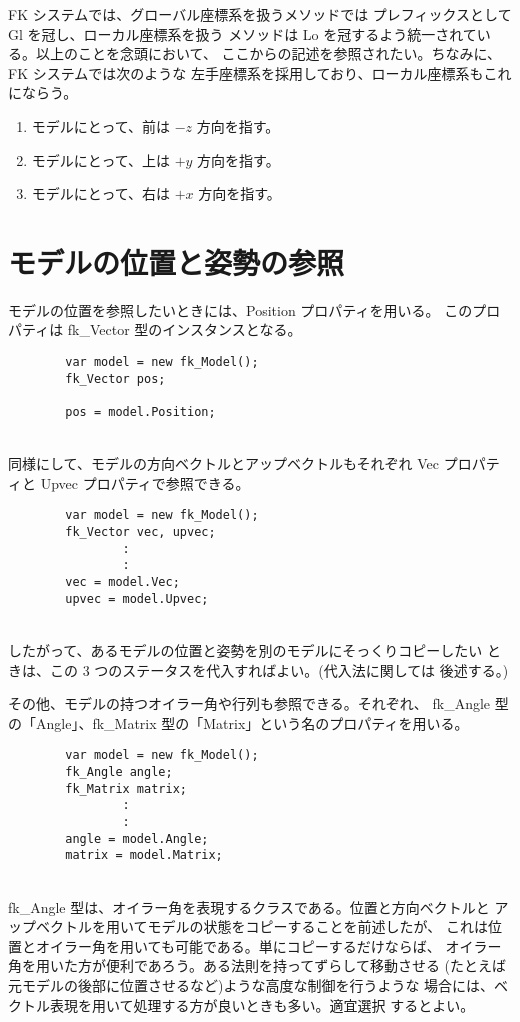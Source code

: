 FK システムでは、グローバル座標系を扱うメソッドでは
プレフィックスとして Gl を冠し、ローカル座標系を扱う
メソッドは Lo を冠するよう統一されている。以上のことを念頭において、
ここからの記述を参照されたい。ちなみに、FK システムでは次のような
左手座標系を採用しており、ローカル座標系もこれにならう。
\begin{enumerate}
 \item モデルにとって、前は \(-z\) 方向を指す。
 \item モデルにとって、上は \(+y\) 方向を指す。
 \item モデルにとって、右は \(+x\) 方向を指す。
\end{enumerate}
\section{モデルの位置と姿勢の参照}
モデルの位置を参照したいときには、Position プロパティを用いる。
このプロパティは fk\_Vector 型のインスタンスとなる。
\\
\begin{screen}
\begin{verbatim}
        var model = new fk_Model();
        fk_Vector pos;

        pos = model.Position;
\end{verbatim}
\end{screen}
~ \\
同様にして、モデルの方向ベクトルとアップベクトルもそれぞれ
Vec プロパティと Upvec プロパティで参照できる。
\\
\begin{screen}
\begin{verbatim}
        var model = new fk_Model();
        fk_Vector vec, upvec;
                :
                :
        vec = model.Vec;
        upvec = model.Upvec;
\end{verbatim}
\end{screen}
~ \\
したがって、あるモデルの位置と姿勢を別のモデルにそっくりコピーしたい
ときは、この 3 つのステータスを代入すればよい。(代入法に関しては
後述する。)

その他、モデルの持つオイラー角や行列も参照できる。それぞれ、
fk\_Angle 型の「Angle」、fk\_Matrix 型の「Matrix」という名のプロパティを用いる。
\\
\begin{screen}
\begin{verbatim}
        var model = new fk_Model();
        fk_Angle angle;
        fk_Matrix matrix;
                :
                :
        angle = model.Angle;
        matrix = model.Matrix;
\end{verbatim}
\end{screen}
~ \\
fk\_Angle 型は、オイラー角を表現するクラスである。位置と方向ベクトルと
アップベクトルを用いてモデルの状態をコピーすることを前述したが、
これは位置とオイラー角を用いても可能である。単にコピーするだけならば、
オイラー角を用いた方が便利であろう。ある法則を持ってずらして移動させる
(たとえば元モデルの後部に位置させるなど)ような高度な制御を行うような
場合には、ベクトル表現を用いて処理する方が良いときも多い。適宜選択
するとよい。
